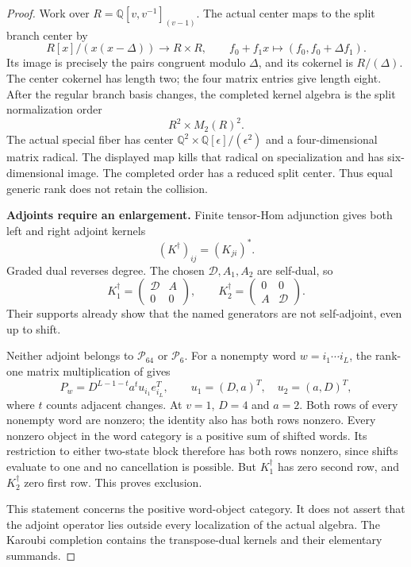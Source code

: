 \begin{proof}
Work over $R=\mathbb Q[v,v^{-1}]_{(v-1)}$.
The actual center maps to the split branch center by
\[
 R[x]/(x(x-\Delta))\longrightarrow R\times R,\qquad
 f_0+f_1x\longmapsto(f_0,f_0+\Delta f_1).
\]
Its image is precisely the pairs congruent modulo
$\Delta$, and its cokernel is $R/(\Delta)$.
The center cokernel has length two; the four matrix
entries give length eight.
After the regular branch basis changes, the completed
kernel algebra is the split normalization order
\[
 R^2\times M_2(R)^2.
\]
The actual special fiber has center
$\mathbb Q^2\times\mathbb Q[\epsilon]/(\epsilon^2)$
and a four-dimensional matrix radical.
The displayed map kills that radical on specialization
and has six-dimensional image.
The completed order has a reduced split center.
Thus equal generic rank does not retain the collision.

\par\smallskip\noindent\textbf{Adjoints require an enlargement.}\quad
Finite tensor-Hom adjunction gives both left and right
adjoint kernels
\[
 (K^\dagger)_{ij}=(K_{ji})^*.
\]
Graded dual reverses degree.
The chosen $\mathcal D,A_1,A_2$ are self-dual, so
\[
 K_1^\dagger=\begin{pmatrix}\mathcal D&A\\0&0\end{pmatrix},
 \qquad
 K_2^\dagger=\begin{pmatrix}0&0\\A&\mathcal D\end{pmatrix}.
\]
Their supports already show that the named generators
are not self-adjoint, even up to shift.

Neither adjoint belongs to $\mathcal P_{64}$ or
$\mathcal P_6$.
For a nonempty word $w=i_1\cdots i_L$, the rank-one
matrix multiplication of  gives
\[
 P_w=D^{L-1-t}a^t u_{i_1}e_{i_L}^{T},\qquad
 u_1=(D,a)^T,\quad u_2=(a,D)^T,
\]
where $t$ counts adjacent changes.
At $v=1$, $D=4$ and $a=2$.
Both rows of every nonempty word are nonzero; the
identity also has both rows nonzero.
Every nonzero object in the word category is a
positive sum of shifted words.
Its restriction to either two-state block therefore
has both rows nonzero, since shifts evaluate to one
and no cancellation is possible.
But $K_1^\dagger$ has zero second row, and
$K_2^\dagger$ zero first row.
This proves exclusion.

This statement concerns the positive word-object
category. It does not assert that the adjoint operator
lies outside every localization of the actual algebra.
The Karoubi completion contains the transpose-dual
kernels and their elementary summands.


\end{proof}
